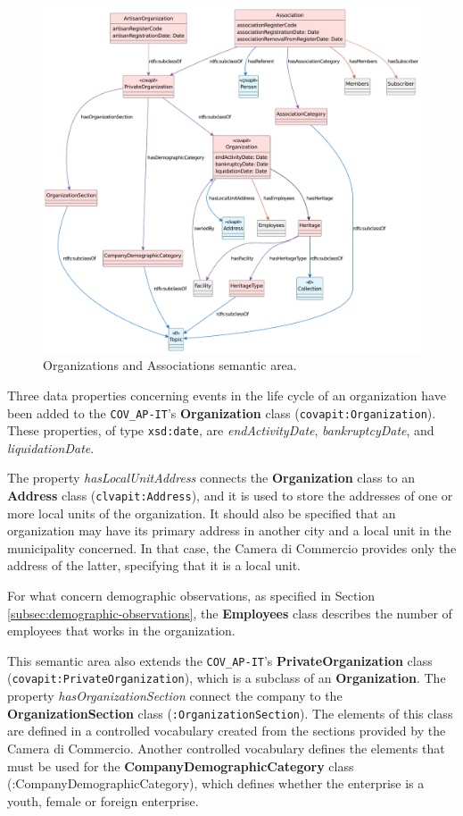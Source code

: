 \begin{figure}[!ht]
  \centering
  \includegraphics[width=\columnwidth]{images/ontoim/organizations}
  \caption{Organizations and Associations semantic area.}
  \label{fig:organizations-sa}
\end{figure}

Three data properties concerning events in the life cycle of an organization have been added to the \verb#COV_AP-IT#'s \textbf{Organization} class (\verb#covapit:Organization#). These properties, of type \verb#xsd:date#, are \textit{endActivityDate}, \textit{bankruptcyDate}, and \textit{liquidationDate}.

The property \textit{hasLocalUnitAddress} connects the \textbf{Organization} class to an \textbf{Address} class (\verb#clvapit:Address#), and it is used to store the addresses of one or more local units of the organization. It should also be specified that an organization may have its primary address in another city and a local unit in the municipality concerned. In that case, the Camera di Commercio provides only the address of the latter, specifying that it is a local unit.

For what concern demographic observations, as specified in Section \ref{subsec:demographic-observations}, the \textbf{Employees} class describes the number of employees that works in the organization.

This semantic area also extends the \verb#COV_AP-IT#'s \textbf{PrivateOrganization} class (\verb#covapit:PrivateOrganization#), which is a subclass of an \textbf{Organization}. The property \textit{hasOrganizationSection} connect the company to the \textbf{OrganizationSection} class (\verb#:OrganizationSection#). The elements of this class are defined in a controlled vocabulary created from the sections provided by the Camera di Commercio. Another controlled vocabulary defines the elements that must be used for the \textbf{CompanyDemographicCategory} class (:CompanyDemographicCategory), which defines whether the enterprise is a youth, female or foreign enterprise.


